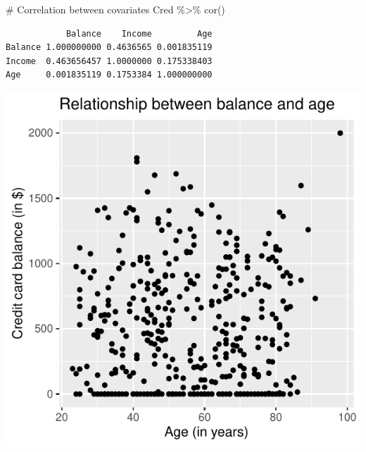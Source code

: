 \documentclass[
  letterpaper,
  DIV=11,
  numbers=noendperiod]{scrartcl}
\newenvironment{Shaded}{\begin{snugshade}}{\end{snugshade}}
\newcommand{\AttributeTok}[1]{\textcolor[rgb]{0.40,0.45,0.13}{#1}}
\newcommand{\CommentTok}[1]{\textcolor[rgb]{0.37,0.37,0.37}{#1}}
\newcommand{\FunctionTok}[1]{\textcolor[rgb]{0.28,0.35,0.67}{#1}}
\newcommand{\NormalTok}[1]{\textcolor[rgb]{0.00,0.23,0.31}{#1}}
\newcommand{\SpecialCharTok}[1]{\textcolor[rgb]{0.37,0.37,0.37}{#1}}
\newcommand{\StringTok}[1]{\textcolor[rgb]{0.13,0.47,0.30}{#1}}
\begin{document}
\begin{tcolorbox}
\begin{Shaded}
\begin{Highlighting}[]
\CommentTok{\# Correlation between covariates}
\NormalTok{Cred }\SpecialCharTok{\%\textgreater{}\%}
  \FunctionTok{cor}\NormalTok{()}
\end{Highlighting}
\end{Shaded}

\begin{verbatim}
            Balance    Income         Age
Balance 1.000000000 0.4636565 0.001835119
Income  0.463656457 1.0000000 0.175338403
Age     0.001835119 0.1753384 1.000000000
\end{verbatim}

\begin{Shaded}
\end{Shaded}

\begin{center}
\includegraphics{about_files/figure-pdf/unnamed-chunk-6-1.pdf}
\end{center}


\end{tcolorbox}
\end{document}
